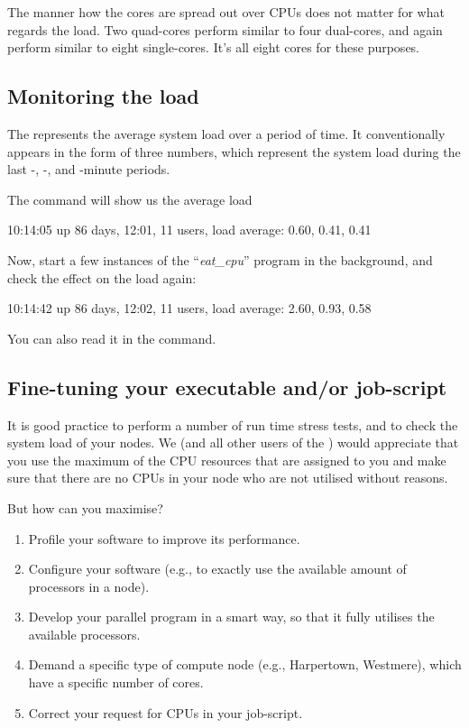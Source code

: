The manner how the cores are spread out over CPUs does not matter for what
regards the load. Two quad-cores perform similar to four dual-cores, and again
perform similar to eight single-cores. It's all eight cores for these purposes.

\subsection{Monitoring the load}

The  represents the average system load over a period of
time. It conventionally appears in the form of three numbers, which represent
the system load during the last -, -, and
-minute periods.

The  command will show us the average load

\begin{prompt}
10:14:05 up 86 days, 12:01, 11 users, load average: 0.60, 0.41, 0.41
\end{prompt}

Now, start a few instances of the ``\emph{eat\_cpu}'' program in the
background, and check the effect on the load again:

\begin{prompt}
10:14:42 up 86 days, 12:02, 11 users, load average: 2.60, 0.93, 0.58
\end{prompt}

You can also read it in the  command.
\subsection{Fine-tuning your executable and/or job-script}

It is good practice to perform a number of run time stress tests, and to check
the system load of your nodes. We (and all other users of the \hpc) would
appreciate that you use the maximum of the CPU resources that are assigned to
you and make sure that there are no CPUs in your node who are not utilised
without reasons.

But how can you maximise?

\begin{enumerate}
\item  Profile your software to improve its performance.
\item  Configure your software (e.g., to exactly use the available amount of processors in a node).
\item  Develop your parallel program in a smart way, so that it fully utilises the available processors.
\item  Demand a specific type of compute node (e.g., Harpertown, Westmere), which have a specific number of cores.
\item  Correct your request for CPUs in your job-script.
\end{enumerate}

